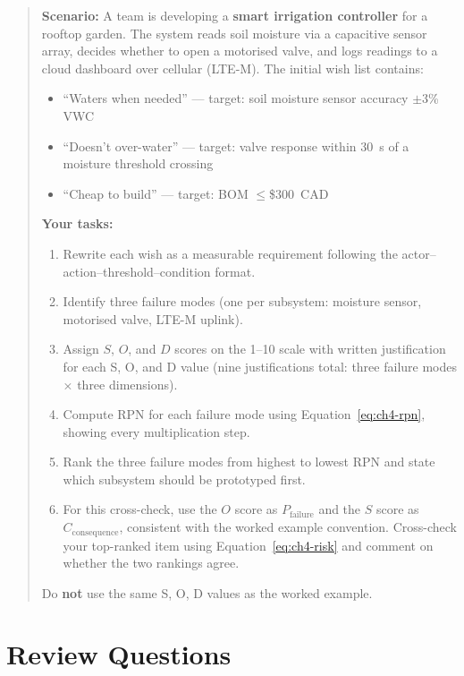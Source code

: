 \begin{quote}
\textbf{Scenario:} A team is developing a \textbf{smart irrigation controller} for a rooftop garden.
The system reads soil moisture via a capacitive sensor array, decides whether to open a motorised valve, and logs readings to a cloud dashboard over cellular (LTE-M).
The initial wish list contains:
\begin{itemize}
  \item ``Waters when needed'' — target: soil moisture sensor accuracy $\pm$3\% VWC
  \item ``Doesn't over-water'' — target: valve response within 30~s of a moisture threshold crossing
  \item ``Cheap to build'' — target: BOM $\leq$\$300~CAD
\end{itemize}

\textbf{Your tasks:}
\begin{enumerate}
  \item Rewrite each wish as a measurable requirement following the actor--action--threshold--condition format.
  \item Identify three failure modes (one per subsystem: moisture sensor, motorised valve, LTE-M uplink).
  \item Assign $S$, $O$, and $D$ scores on the 1–10 scale with written justification for each S, O, and D value (nine justifications total: three failure modes × three dimensions).
  \item Compute RPN for each failure mode using Equation~\eqref{eq:ch4-rpn}, showing every multiplication step.
  \item Rank the three failure modes from highest to lowest RPN and state which subsystem should be prototyped first.
  \item For this cross-check, use the $O$ score as $P_{\text{failure}}$ and the $S$ score as $C_{\text{consequence}}$, consistent with the worked example convention. Cross-check your top-ranked item using Equation~\eqref{eq:ch4-risk} and comment on whether the two rankings agree.
\end{enumerate}
Do \textbf{not} use the same S, O, D values as the worked example.
\end{quote}

\section*{Review Questions}
\label{sec:ch4-review}

